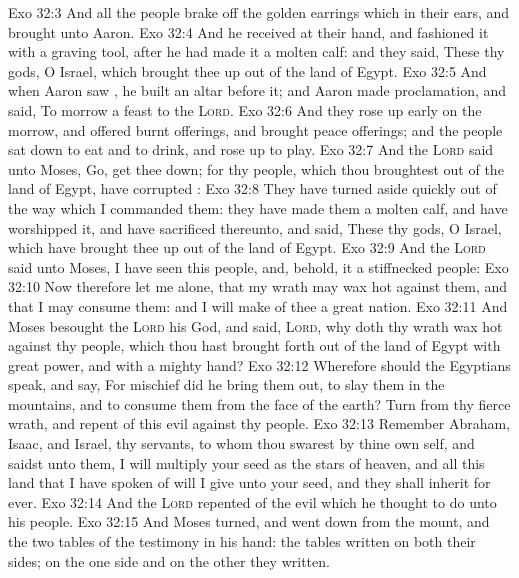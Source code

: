 \vs Exo 32:3 And all the people brake off the golden earrings which  in their ears, and brought  unto Aaron.
\vs Exo 32:4 And he received  at their hand, and fashioned it with a graving tool, after he had made it a molten calf: and they said, These  thy gods, O Israel, which brought thee up out of the land of Egypt.
\vs Exo 32:5 And when Aaron saw , he built an altar before it; and Aaron made proclamation, and said, To morrow  a feast to the \textsc{Lord}.
\vs Exo 32:6 And they rose up early on the morrow, and offered burnt offerings, and brought peace offerings; and the people sat down to eat and to drink, and rose up to play.
\vs Exo 32:7 And the \textsc{Lord} said unto Moses, Go, get thee down; for thy people, which thou broughtest out of the land of Egypt, have corrupted :
\vs Exo 32:8 They have turned aside quickly out of the way which I commanded them: they have made them a molten calf, and have worshipped it, and have sacrificed thereunto, and said, These  thy gods, O Israel, which have brought thee up out of the land of Egypt.
\vs Exo 32:9 And the \textsc{Lord} said unto Moses, I have seen this people, and, behold, it  a stiffnecked people:
\vs Exo 32:10 Now therefore let me alone, that my wrath may wax hot against them, and that I may consume them: and I will make of thee a great nation.
\vs Exo 32:11 And Moses besought the \textsc{Lord} his God, and said, \textsc{Lord}, why doth thy wrath wax hot against thy people, which thou hast brought forth out of the land of Egypt with great power, and with a mighty hand?
\vs Exo 32:12 Wherefore should the Egyptians speak, and say, For mischief did he bring them out, to slay them in the mountains, and to consume them from the face of the earth? Turn from thy fierce wrath, and repent of this evil against thy people.
\vs Exo 32:13 Remember Abraham, Isaac, and Israel, thy servants, to whom thou swarest by thine own self, and saidst unto them, I will multiply your seed as the stars of heaven, and all this land that I have spoken of will I give unto your seed, and they shall inherit  for ever.
\vs Exo 32:14 And the \textsc{Lord} repented of the evil which he thought to do unto his people.
\vs Exo 32:15 And Moses turned, and went down from the mount, and the two tables of the testimony  in his hand: the tables  written on both their sides; on the one side and on the other  they written.
